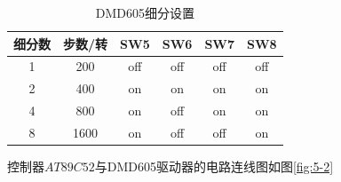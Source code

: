 \begin{table}[htbp]
	\centering
	\caption{DMD605细分设置}
	\begin{tabular}{cccccc}
		\toprule
		\toprule
		细分数  & 步数/转  &	SW5  & SW6  & SW7  & SW8 \\
		\midrule
		1  & 200  &  off  & off  & off  & off  \\
		2  & 400  & on  & on  & on  & on \\
		4  & 800  & on  & off & on  & on \\
		8  & 1600  & on  & off  & off  & on  \\
		\bottomrule
		\bottomrule
	\end{tabular}%
	\label{tab:5-1}%
\end{table}%


控制器$AT89C52$与DMD605驱动器的电路连线图如图\ref{fig:5-2}

